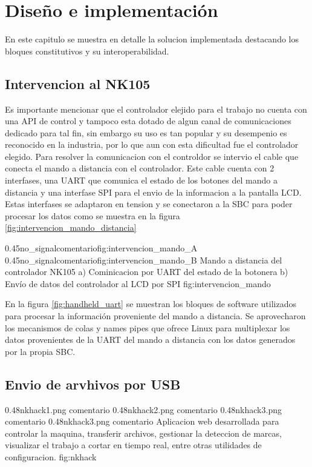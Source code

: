 \chapter{Diseño e implementación} %

\label{Chapter3} 

En este capitulo se muestra en detalle la solucion implementada destacando los bloques constitutivos y su interoperabilidad.


\section{Intervencion al NK105}

   Es importante mencionar que el controlador elejido para el trabajo no cuenta con una API de control y tampoco esta dotado de algun canal de comunicaciones dedicado para tal fin, sin embargo su uso es tan popular y su desempenio es reconocido en la industria, por lo que aun con esta dificultad fue el controlador elegido.
   Para resolver la comunicacion con el controldor se intervio el cable que conecta el mando a distancia con el controlador.
   Este cable cuenta con 2 interfases, una UART que comunica el estado de los botones del mando a distancia y una interfase SPI para el envio de la informacion a la pantalla LCD.
Estas interfases se adaptaron en tension y se conectaron a la SBC para poder procesar los datos como se muestra en la figura \ref{fig:intervencion_mando_distancia}

\subfigab
   {0.45}{no_signal}{comentario}{fig:intervencion_mando_A}
   {0.45}{no_signal}{comentario}{fig:intervencion_mando_B}
         {Mando a distancia del controlador NK105 a) Cominicacion por UART del estado de la botonera b) Envío de datos del controlador al LCD por SPI}
         {fig:intervencion_mando}

En la figura \ref{fig:handheld_uart} se muestran los bloques de software utilizados para procesar la información proveniente del mando a distancia.
   Se aprovecharon los mecanismos de colas y names pipes que ofrece Linux para multiplexar los datos provenientes de la UART del mando a distancia con los datos generados por la propia SBC.


\section{Envio de arvhivos por USB}

\subfigtwotwo
         {0.48}{nkhack1.png} {comentario}
         {0.48}{nkhack2.png} {comentario}
         {0.48}{nkhack3.png} {comentario}
         {0.48}{nkhack3.png} {comentario}
         {Aplicacion web desarrollada para controlar la maquina, transferir archivos, gestionar la deteccion de marcas, visualizar el trabajo a cortar en tiempo real, entre otras utilidades de configuracion.}
         {fig:nkhack}
